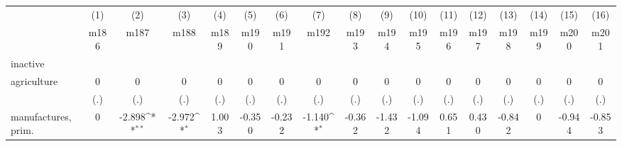 {
\def\sym#1{\ifmmode^{#1}\else\(^{#1}\)\fi}
\begin{tabular}{l*{16}{c}}
\hline\hline
                    &\multicolumn{1}{c}{(1)}&\multicolumn{1}{c}{(2)}&\multicolumn{1}{c}{(3)}&\multicolumn{1}{c}{(4)}&\multicolumn{1}{c}{(5)}&\multicolumn{1}{c}{(6)}&\multicolumn{1}{c}{(7)}&\multicolumn{1}{c}{(8)}&\multicolumn{1}{c}{(9)}&\multicolumn{1}{c}{(10)}&\multicolumn{1}{c}{(11)}&\multicolumn{1}{c}{(12)}&\multicolumn{1}{c}{(13)}&\multicolumn{1}{c}{(14)}&\multicolumn{1}{c}{(15)}&\multicolumn{1}{c}{(16)}\\
                    &\multicolumn{1}{c}{m186}&\multicolumn{1}{c}{m187}&\multicolumn{1}{c}{m188}&\multicolumn{1}{c}{m189}&\multicolumn{1}{c}{m190}&\multicolumn{1}{c}{m191}&\multicolumn{1}{c}{m192}&\multicolumn{1}{c}{m193}&\multicolumn{1}{c}{m194}&\multicolumn{1}{c}{m195}&\multicolumn{1}{c}{m196}&\multicolumn{1}{c}{m197}&\multicolumn{1}{c}{m198}&\multicolumn{1}{c}{m199}&\multicolumn{1}{c}{m200}&\multicolumn{1}{c}{m201}\\
\hline
inactive            &                     &                     &                     &                     &                     &                     &                     &                     &                     &                     &                     &                     &                     &                     &                     &                     \\
agriculture         &           0         &           0         &           0         &           0         &           0         &           0         &           0         &           0         &           0         &           0         &           0         &           0         &           0         &           0         &           0         &           0         \\
                    &         (.)         &         (.)         &         (.)         &         (.)         &         (.)         &         (.)         &         (.)         &         (.)         &         (.)         &         (.)         &         (.)         &         (.)         &         (.)         &         (.)         &         (.)         &         (.)         \\
[1em]
manufactures, prim. &           0         &      -2.898\sym{**} &      -2.972\sym{*}  &       1.003         &      -0.350         &      -0.232         &      -1.140\sym{*}  &      -0.362         &      -1.432         &      -1.094         &       0.651         &       0.430         &      -0.842         &           0         &      -0.944         &      -0.853         \\

\end{tabular}}
